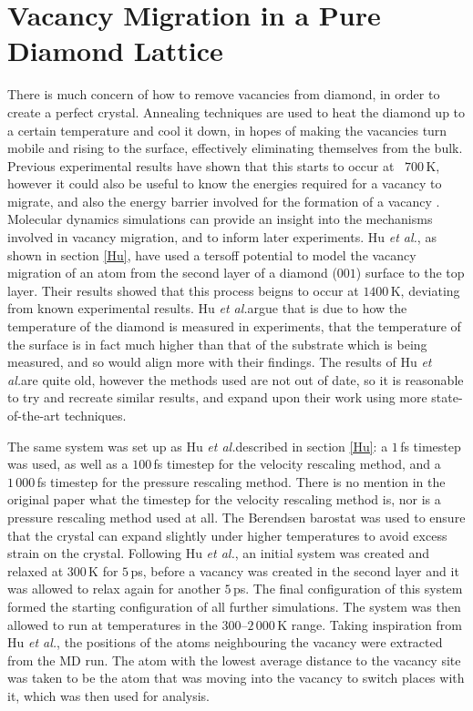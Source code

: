 \documentclass[10pt,a4paper,twocolumn,twoside]{extarticle}
\newcommand{\al}{\emph{et al.}}
\begin{document}
\section{Vacancy Migration in a Pure Diamond Lattice}
\label{sec:vacancy}
There is much concern of how to remove vacancies from diamond, in order to create a perfect crystal. Annealing techniques are used to heat the diamond up to a certain temperature and cool it down, in hopes of making the vacancies turn mobile and rising to the surface, effectively eliminating themselves from the bulk. Previous experimental results have shown that this starts to occur at ~$700$\,K, however it could also be useful to know the energies required for a vacancy to migrate, and also the energy barrier involved for the formation of a vacancy \cite{VacancyTemp}. Molecular dynamics simulations can provide an insight into the mechanisms involved in vacancy migration, and to inform later experiments. Hu \al, as shown in section \ref{Hu}, have used a tersoff potential to model the vacancy migration of an atom from the second layer of a diamond ($001$) surface to the top layer. Their results showed that this process beigns to occur at $1400$\,K, deviating from known experimental results. Hu \al argue that is due to how the temperature of the diamond is measured in experiments, that the temperature of the surface is in fact much higher than that of the substrate which is being measured, and so would align more with their findings. The results of Hu \al are quite old, however the methods used are not out of date, so it is reasonable to try and recreate similar results, and expand upon their work using more state-of-the-art techniques. 

The same system was set up as Hu \al described in section \ref{Hu}: a $1$\,fs timestep was used, as well as a $100$\,fs timestep for the velocity rescaling method, and a $1\,000$\,fs timestep for the pressure rescaling method. There is no mention in the original paper what the timestep for the velocity rescaling method is, nor is a pressure rescaling method used at all. The Berendsen barostat was used to ensure that the crystal can expand slightly under higher temperatures to avoid excess strain on the crystal. Following Hu \al, an initial system was created and relaxed at $300$\,K for $5$\,ps, before a vacancy was created in the second layer and it was allowed to relax again for another $5$\,ps. The final configuration of this system formed the starting configuration of all further simulations. The system was then allowed to run at temperatures in the $300$--$2\,000$\,K range. Taking inspiration from Hu \al, the positions of the atoms neighbouring the vacancy were extracted from the MD run. The atom with the lowest average distance to the vacancy site was taken to be the atom that was moving into the vacancy to switch places with it, which was then used for analysis. 
\end{document}
